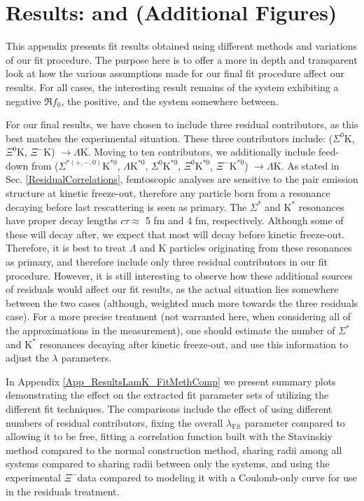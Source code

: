 \documentclass[/home/jesse/Analysis/FemtoAnalysis/AnalysisNotes/AnalysisNoteJBuxton.tex]{subfiles}
\begin{document}
\section{Results: \LamKs and \LamKpm (Additional Figures)}
\label{App_Results}

This appendix presents fit results obtained using different methods and variations of our fit procedure.
The purpose here is to offer a more in depth and transparent look at how the various assumptions made for our final fit procedure affect our results.
For all cases, the interesting result remains of the \LamKchP system exhibiting a negative $\Re f_{0}$, the \LamKchM positive, and the \LamKs system somewhere between.

For our final results, we have chosen to include three residual contributors, as this best matches the experimental situation.
These three contributors include: ($\Sigma^{0}\mathrm{K}$, $\Xi^{0}\mathrm{K}$, $\Xi^{-}\mathrm{K}$) $\rightarrow \Lambda\mathrm{K}$.
Moving to ten contributors, we additionally include feed-down from ($\Sigma^{* (+,-,0)}\mathrm{K}^{*0}$, $\Lambda\mathrm{K}^{*0}$, $\Sigma^{0}\mathrm{K}^{*0}$, $\Xi^{0}\mathrm{K}^{*0}$, $\Xi^{-}\mathrm{K}^{*0}$) $\rightarrow \Lambda\mathrm{K}$.
As stated in Sec. \ref{ResidualCorrelations}, femtoscopic analyses are sensitive to the pair emission structure at kinetic freeze-out, therefore any particle born from a resonance decaying before last rescattering is seen as primary.
The $\Sigma^{*}$ and $\mathrm{K}^{*}$ resonances have proper decay lengths $c\tau \approx$ 5 fm and 4 fm, respectively.
Although some of these will decay after, we expect that most will decay before kinetic freeze-out.
Therefore, it is best to treat $\Lambda$ and $\mathrm{K}$ particles originating from these resonances as primary, and therefore include only three residual contributors in our fit procedure.
However, it is still interesting to observe how these additional sources of residuals would affect our fit results, as the actual situation lies somewhere between the two cases (although, weighted much more towards the three residuals case).
For a more precise treatment (not warranted here, when considering all of the approximations in the measurement), one should estimate the number of $\Sigma^{*}$ and $\mathrm{K}^{*}$ resonances decaying after kinetic freeze-out, and use this information to adjust the $\lambda$ parameters.


In Appendix \ref{App_ResultsLamK_FitMethComp} we present summary plots demonstrating the effect on the extracted fit parameter sets of utilizing the different fit techniques.
The comparisons include the effect of using different numbers of residual contributors, fixing the overall $\lambda_{\mathrm{Fit}}$ parameter compared to allowing it to be free, fitting a correlation function built with the Stavinskiy method compared to the normal construction method, sharing radii among all \LamK systems compared to sharing radii between only the \LamKpm systems, and using the experimental $\Xi^{-}$\Kpm data compared to modeling it with a Coulomb-only curve for use in the residuals treatment.
\end{document}
